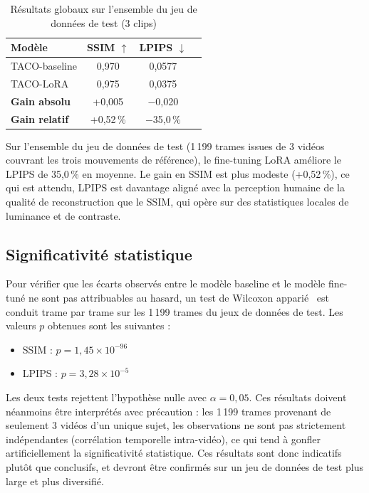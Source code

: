 \begin{table}[h]
  \centering
  \begin{tabular}{lccc}
    \hline
    \textbf{Modèle} & \textbf{SSIM} $\uparrow$ & \textbf{LPIPS} $\downarrow$ \\
    \hline
    TACO-baseline          & 0,970 & 0,0577 \\
    TACO-LoRA & 0,975 & 0,0375 \\
    \hline
    \textbf{Gain absolu}   & +0,005 & $-$0,020 \\
    \textbf{Gain relatif}  & +0,52\,\% & $-$35,0\,\% \\
    \hline
  \end{tabular}
  \caption{Résultats globaux sur l'ensemble du jeu de données de test (3 clips)}
  \label{tab:resultats-globaux}
\end{table}

Sur l'ensemble du jeu de données de test (1\,199 trames issues de 3 vidéos couvrant les trois mouvements de référence), le fine-tuning LoRA améliore le LPIPS de 35,0\,\% en moyenne. Le gain en SSIM est plus modeste (+0,52\,\%), ce qui est attendu, LPIPS est davantage aligné avec la perception humaine de la qualité de reconstruction que le SSIM, qui opère sur des statistiques locales de luminance et de contraste.

\subsection{Significativité statistique}

Pour vérifier que les écarts observés entre le modèle baseline et le modèle fine-tuné ne sont pas attribuables au hasard, un test de Wilcoxon apparié~\cite{Wilcoxon-1945} est conduit trame par trame sur les 1\,199 trames du jeux de données de test. Les valeurs $p$ obtenues sont les suivantes :

\begin{itemize}
  \item SSIM  : $p = 1{,}45 \times 10^{-96}$
  \item LPIPS : $p = 3{,}28 \times 10^{-5}$
\end{itemize}

Les deux tests rejettent l'hypothèse nulle avec $\alpha = 0{,}05$. Ces résultats doivent néanmoins être interprétés avec précaution : les 1\,199 trames provenant de seulement 3 vidéos d'un unique sujet, les observations ne sont pas strictement indépendantes (corrélation temporelle intra-vidéo), ce qui tend à gonfler artificiellement la significativité statistique. Ces résultats sont donc indicatifs plutôt que conclusifs, et devront être confirmés sur un jeu de données de test plus large et plus diversifié.

